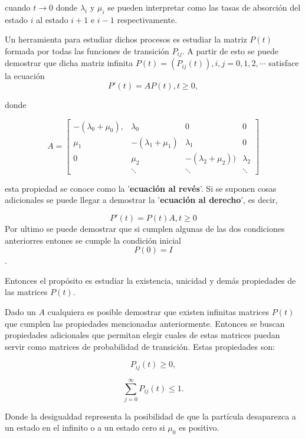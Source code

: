 \documentclass[letter,twoside,12pt]{article}
\numberwithin{equation}{section}
\begin{document}
cuando $ t \to 0 $ donde $\lambda_i$ y $\mu_i$ se pueden interpretar como las tasas de absorción del estado $ i $ al estado $ i+1 $ e $ i-1 $ respectivamente.

Un herramienta para estudiar dichos procesos es estudiar la matriz $P(t) $ formada por todas las funciones de transición $ P_{ij}$. A partir de esto se puede demostrar que dicha matriz infinita
$ P(t) = (P_{ij}(t)), i, j = 0, 1, 2, \cdots $ satisface la ecuación
\begin{equation}
P'(t)=AP(t), t \geq 0, \nonumber
\end{equation}

donde

\begin{equation}
A=\begin{bmatrix}
-(\lambda_0+ \mu_0), & \lambda_0 & 0 & 0
\\ \mu_1 & -(\lambda_1+ \mu_1) & \lambda_1 & 0
\\ 0 & \mu_2 & -(\lambda_2+ \mu_2)) & \lambda_2
\\ & \ddots & \ddots& \ddots
\end{bmatrix} \nonumber
\end{equation}

esta propiedad se conoce como la '\textbf{ecuación al revés}'. Si se suponen cosas adicionales se puede llegar a demostrar la '\textbf{ecuación al derecho}', es decir,

$$ P'(t) = P(t)A, t \geq 0 $$ 
Por ultimo se puede demostrar que si cumplen algunas de las dos condiciones anteriorres entones se cumple la condición inicial $$ P(0) = I $$.

Entonces el propósito es estudiar la existencia, unicidad y demás propiedades de las matrices $ P(t) $.

Dado un $ A $ cualquiera es posible demostrar que existen infinitas matrices $P(t)$ que cumplen las propiedades mencionadas anteriormente. Entonces se buscan propiedades adicionales que permitan elegir cuales de estas matrices puedan servir como matrices de probabilidad de transición. Estas propiedades son:

\begin{equation}
P_{ij}(t)  \geq 0,\nonumber
\end{equation}

\begin{equation}
\sum_{j=0}^\infty P_{ij}(t) \leq 1. \nonumber
\end{equation}

Donde la desigualdad representa la posibilidad de que la partícula desaparezca a un estado en el infinito o a un estado cero si $ \mu_0 $ es positivo.
\end{document}
